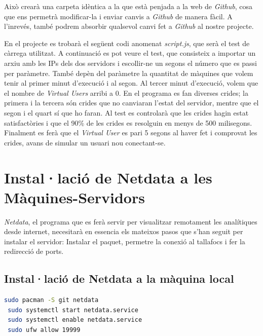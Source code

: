 Això crearà una carpeta idèntica a la que està penjada a la web de \textit{Github}, cosa que ens permetrà modificar-la i enviar canvis a \textit{Github} de manera fàcil. A l'inrevés, també podrem absorbir qualsevol canvi fet a \textit{Github} al nostre projecte.

En el projecte es trobarà el següent codi anomenat \textit{script.js}, que serà el test de càrrega utilitzat. A continuació es pot veure el test, que consisteix a importar un arxiu amb les IPs dels dos servidors i escollir-ne un segons el número que es passi per paràmetre. També depèn del paràmetre la quantitat de màquines que volem tenir al primer minut d'execució i al segon. Al tercer minut d'execució, volem que el nombre de \textit{Virtual Users} arribi a 0. En el programa es fan diverses crides; la primera i la tercera són crides que no canviaran l'estat del servidor, mentre que el segon i el quart sí que ho faran. Al test es controlarà que les crides hagin estat satisfactòries i que el 90\% de les crides es resolguin en menys de 500 milisegons. Finalment es ferà que el \textit{Virtual User} es pari 5 segons al haver fet i comprovat les crides, avans de simular un usuari nou conectant-se.

\label{codi:testDeCarrega}
\newpage


\newpage
\section{Instal·lació de Netdata a les Màquines-Servidors}

\textit{Netdata}, el programa que es ferà servir per visualitzar remotament les analítiques desde internet, necesitarà en essencia els mateixos pasos que s'han seguit per instalar el servidor: Instalar el paquet, permetre la conexió al tallafocs i fer la redirecció de ports. \cite{noauthor_netdata_nodate}

\subsection{Instal·lació de Netdata a la màquina local}

\begin{lstlisting}[language=bash, caption=Instal·lació de netdata al local]
 sudo pacman -S git netdata
 sudo systemctl start netdata.service
 sudo systemctl enable netdata.service
 sudo ufw allow 19999
\end{lstlisting}

